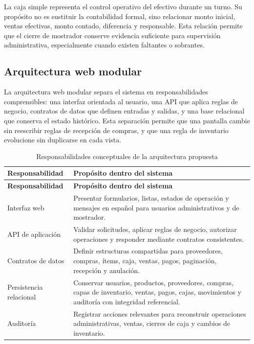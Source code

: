 La caja simple representa el control operativo del efectivo durante un turno. Su propósito no es sustituir la contabilidad formal, sino relacionar monto inicial, ventas efectivas, monto contado, diferencia y responsable. Esta relación permite que el cierre de mostrador conserve evidencia suficiente para supervisión administrativa, especialmente cuando existen faltantes o sobrantes.

\subsection{Arquitectura web modular}

La arquitectura web modular separa el sistema en responsabilidades comprensibles: una interfaz orientada al usuario, una API que aplica reglas de negocio, contratos de datos que definen entradas y salidas, y una base relacional que conserva el estado histórico. Esta separación permite que una pantalla cambie sin reescribir reglas de recepción de compras, y que una regla de inventario evolucione sin duplicarse en cada vista.

\begin{longtable}{p{}p{}}
\caption{Responsabilidades conceptuales de la arquitectura propuesta}\\
\toprule
\textbf{Responsabilidad} & \textbf{Propósito dentro del sistema}\\
\midrule
\endfirsthead
\toprule
\textbf{Responsabilidad} & \textbf{Propósito dentro del sistema}\\
\midrule
\endhead
Interfaz web & Presentar formularios, listas, estados de operación y mensajes en español para usuarios administrativos y de mostrador.\\
API de aplicación & Validar solicitudes, aplicar reglas de negocio, autorizar operaciones y responder mediante contratos consistentes.\\
Contratos de datos & Definir estructuras compartidas para proveedores, compras, ítems, caja, ventas, pagos, paginación, recepción y anulación.\\
Persistencia relacional & Conservar usuarios, productos, proveedores, compras, capas de inventario, ventas, pagos, cajas, movimientos y auditoría con integridad referencial.\\
Auditoría & Registrar acciones relevantes para reconstruir operaciones administrativas, ventas, cierres de caja y cambios de inventario.\\
\bottomrule
\end{longtable}

